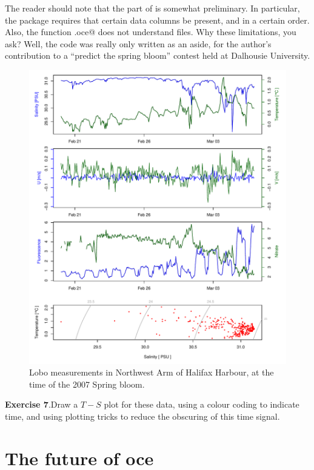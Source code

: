 \documentclass{article}
\newcommand{\workedexercise}[2]{
	\vspace{2ex plus 2ex minus 1ex}
	\begin{boxedminipage}[c]{0.95\linewidth}
		{\textbf{Exercise #1}.\hspace{1em}#2}
	\end{boxedminipage}
	\vspace{2ex plus 2ex minus 1ex}
}
\begin{document}
The reader should note that the \verb@lobo@ part of \verb@oce@ is somewhat
preliminary. In particular, the package requires that certain data columns be
present, and in a certain order. Also, the function \verb@read.oce@ does not
understand \verb@lobo@ files. Why these limitations, you ask? Well, the
\verb@lobo@ code was really only written as an aside, for the author's
contribution to a ``predict the spring bloom'' contest held at Dalhousie
University.

\begin{figure}
\begin{center}
\includegraphics{oce-lobofig}
\end{center}
\caption{Lobo measurements in Northwest Arm of Halifax Harbour, at
the time of the 2007 Spring bloom.}
\label{fig:lobo}
\end{figure}

\workedexercise{7}{Draw a $T-S$ plot for these data, using a colour coding to indicate time,
and using plotting tricks to reduce the obscuring of this time signal.}


\section{The future of oce}
\end{document}
